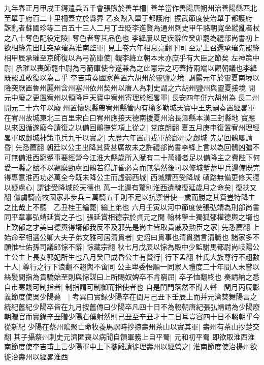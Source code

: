 九年春正月甲戌王鍔遣兵五千會張煦於善羊柵|{
	善羊當作善陽唐朔州治善陽縣西北至單于府百二十里柵蓋立於縣界}
乙亥煦入單于都護府|{
	振武節度使治單于都護府}
誅亂者蘇國珍等二百五十三人二月丁丑貶李進賢為通州刺史甲午駱朝寛坐縱亂者杖之八十奪色配役定陵|{
	奪色者奪其品色也}
李絳屢以足疾辭位癸卯罷為禮部尚書初上欲相絳先出吐突承璀為淮南監軍|{
	見上卷六年相息亮翻下同}
至是上召還承璀先罷絳相甲辰承璀至京師復以為弓箭庫使|{
	觀李絳立朝本末亦庶乎有大臣之節矣}
左神策中尉|{
	承璀以喪師罷中尉為弓箭庫使今遂兼為之此憲宗之巧蓋持兩端以觀朝議也李絳既罷誰敢復以為言乎}
李吉甫奏國家舊置六胡州於靈鹽之境|{
	調露元年於靈夏南境以降突厥置魯州麗州含州塞州依州契州以唐人為刺史謂之六胡州鹽州與靈夏接境}
開元中廢之更置宥州以領降戶天寶中宥州寄理於經畧軍|{
	長安四年併六胡州為長二州開元二十六年以廢州置懷恩縣帶宥州縣管内有榆多勒城天寶中王忠嗣奏置經畧軍在宥州故城東北三百里宋白曰宥州應接天德南援夏州治長澤縣本漢三封縣地}
寶應以來因循遂廢今請復之以備回鶻撫党項上從之|{
	党㡳朗翻}
夏五月庚申復置宥州理經畧軍取鄜城神策屯兵九千以實之|{
	大歷六年置肅戎軍於鄜州之鄜城}
先是回鶻屢請昏|{
	先悉薦翻}
朝廷以公主出降其費甚廣故未之許禮部尚書李絳上言以為回鶻凶彊不可無備淮西窮蹙事要經營今江淮大縣歲所入賦有二十萬緡者足以備降主之費陛下何愛一縣之賦不以羈縻勁虜回鶻若得許昏必喜而無猜然後可以修城塹蓄甲兵邊備既完得專意淮西功必萬全今既未降公主而虛弱西城|{
	西城謂西受降城}
磧路無備更修天德以疑虜心|{
	謂徙受降城於天德也}
萬一北邊有驚則淮西遺醜復延歲月之命矣|{
	復扶又翻}
儻虜騎南牧國家非步兵三萬騎五千則不足以抗禦借使一歲而勝之其費豈特降主之比哉上不聽　乙丑桂王綸薨|{
	綸上弟也}
六月壬寅以河中節度使張弘靖為刑部尚書同平章事弘靖延賞之子也|{
	張延賞相德宗於貞元之間}
翰林學士獨狐郁權德輿之壻也上歎郁之才美曰德輿得壻郁我反不及邪先是尚主皆取貴戚及勲臣之家|{
	先悉薦翻}
上始命宰相選公卿大夫子弟文雅可居清貫者|{
	史炤曰貫事也清貫猶言清職也}
諸家多不願惟杜佑孫司議郎悰不辭|{
	悰藏宗翻}
秋七月戊辰以悰為殿中少監駙馬都尉尚岐陽公主公主上長女郭妃所生也八月癸巳成昏公主有賢行|{
	行下孟翻}
杜氏大族尊行不趐數十人|{
	尊行之行下浪翻不趐與不啻同}
公主卑委怡順一同家人禮度二十年間人未嘗以絲髪間指為貴驕始至則與悰謀曰上所賜奴婢卒不肯窮屈|{
	卒子恤翻終也}
奏請納之悉自市寒賤可制指者|{
	制指謂可制御而指使者也}
自是閨門落然不聞人聲　閏月丙辰彰義節度使吳少陽薨　|{
	考異曰實録少陽卒在閏月己丑下壬辰上而并元濟焚舞陽言之統紀舊紀少陽卒皆在九月按舊傳曰少陽卒凡四十日不為輟朝唐紀張弘靖請為少陽廢朝贈官而實錄辛丑贈少陽右僕射然則己丑至辛丑才十二日耳豈容四十日不輟朝乎今從新紀}
少陽在蔡州隂聚亡命牧養馬騾時抄掠壽州茶山以實其軍|{
	壽州有茶山抄楚交翻}
其子攝蔡州刺史元濟匿喪以病聞自領軍務上自平蜀|{
	元和初平蜀}
即欲取淮西淮南節度使李吉甫上言少陽軍中上下攜離請徙理壽州以經營之|{
	淮南節度使治揚州欲徙治夀州以經畧淮西}
